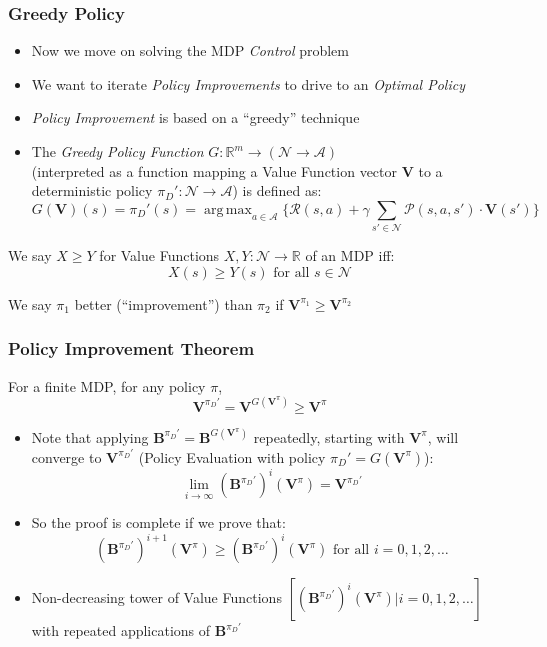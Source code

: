 \documentclass[handout]{beamer}
\DeclareMathOperator*{\argmax}{arg\,max}
\newcommand{\bvpi}{\bm{V}^{\pi}}
\newcommand{\bv}{\bm{V}}
\begin{document}
\begin{frame}
\frametitle{Greedy Policy}
\pause
\begin{itemize}[<+->]
\item Now we move on solving the MDP {\em Control} problem
\item We want to iterate {\em Policy Improvements} to drive to an {\em Optimal Policy}
\item {\em Policy Improvement} is based on a ``greedy'' technique
\item The {\em Greedy Policy Function} $G: \mathbb{R}^m \rightarrow (\mathcal{N} \rightarrow \mathcal{A})$\\
(interpreted as a function mapping a Value Function vector $\bv$ to a deterministic policy $\pi_D': \mathcal{N} \rightarrow \mathcal{A}$) is defined as:
$$G(\bv)(s) = \pi_D'(s) = \argmax_{a\in \mathcal{A}} \{\mathcal{R}(s,a) + \gamma \sum_{s' \in \mathcal{N}} \mathcal{P}(s,a,s') \cdot \bv(s') \}$$
\end{itemize}
\pause
\begin{definition}
We say $X \geq Y$ for Value Functions $X, Y: \mathcal{N} \rightarrow \mathbb{R}$ of an MDP iff:
$$X(s) \geq Y(s) \text{ for all } s \in \mathcal{N}$$
\end{definition}
\pause
We say $\pi_1$ better (``improvement'') than $\pi_2$ if $\bm{V}^{\pi_1} \geq \bm{V}^{\pi_2}$
\end{frame}

\begin{frame}
\frametitle{Policy Improvement Theorem}
\begin{theorem}
For a finite MDP, for any policy $\pi$,
$$\bm{V}^{\pi_D'} = \bm{V}^{G(\bvpi)} \geq \bvpi$$
\label{th:policy_improvement_theorem}
\end{theorem}
\pause
\begin{itemize}[<+->]
\item Note that applying $\bm{B}^{\pi_D'} = \bm{B}^{G(\bvpi)}$ repeatedly, starting with $\bvpi$, will converge to $\bm{V}^{\pi_D'}$ (Policy Evaluation with policy $\pi_D' = G(\bvpi)$):
$$\lim_{i\rightarrow \infty} (\bm{B}^{\pi_D'})^i(\bvpi) = \bm{V}^{\pi_D'}$$
\item So the proof is complete if we prove that:
$$(\bm{B}^{\pi_D'})^{i+1}(\bvpi) \geq (\bm{B}^{\pi_D'})^i(\bvpi) \text{ for all } i = 0, 1, 2, \ldots$$
\item Non-decreasing tower of Value Functions $[(\bm{B}^{\pi_D'})^i(\bvpi)|i = 0, 1, 2, \ldots]$ with repeated applications of $\bm{B}^{\pi_D'}$
\end{itemize}
\end{frame}
\end{document}
